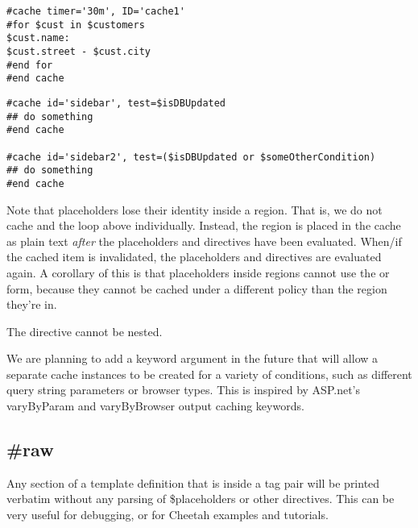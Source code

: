 \begin{verbatim}
#cache timer='30m', ID='cache1'
#for $cust in $customers
$cust.name:
$cust.street - $cust.city
#end for
#end cache
\end{verbatim}

\begin{verbatim}
#cache id='sidebar', test=$isDBUpdated
## do something
#end cache

#cache id='sidebar2', test=($isDBUpdated or $someOtherCondition)
## do something
#end cache
\end{verbatim}

Note that placeholders lose their identity inside a  region.
That is, we do not cache  and the  loop above
individually.  Instead, the region is placed in the cache as plain text
{\em after} the placeholders and directives have been evaluated.  When/if
the cached item is invalidated, the placeholders and directives are evaluated
again.  A corollary of this is that placeholders inside 
regions cannot use the  or  form,
because they cannot be cached under a different policy than the region 
they're in.

The  directive cannot be nested.

We are planning to add a  keyword argument in the future that
will allow a separate cache instances to be created for a variety of conditions,
such as different query string parameters or browser types. This is inspired by
ASP.net's varyByParam and varyByBrowser output caching keywords.



\subsection{\#raw}
\label{output.raw}

Any section of a template definition that is inside a  tag pair will be printed verbatim without any parsing of
\$placeholders or other directives. This can be very useful for debugging, or
for Cheetah examples and tutorials.

